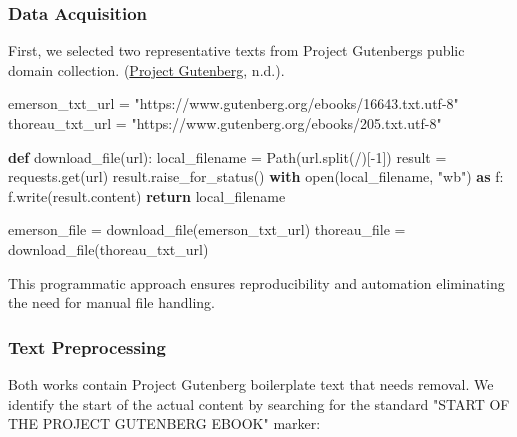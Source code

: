 \documentclass[
]{article}
\newenvironment{Shaded}{}{}
\newcommand{\BuiltInTok}[1]{\textcolor[rgb]{0.00,0.50,0.00}{#1}}
\newcommand{\ControlFlowTok}[1]{\textcolor[rgb]{0.00,0.44,0.13}{\textbf{#1}}}
\newcommand{\DecValTok}[1]{\textcolor[rgb]{0.25,0.63,0.44}{#1}}
\newcommand{\ImportTok}[1]{\textcolor[rgb]{0.00,0.50,0.00}{\textbf{#1}}}
\newcommand{\KeywordTok}[1]{\textcolor[rgb]{0.00,0.44,0.13}{\textbf{#1}}}
\newcommand{\NormalTok}[1]{#1}
\newcommand{\OperatorTok}[1]{\textcolor[rgb]{0.40,0.40,0.40}{#1}}
\newcommand{\StringTok}[1]{\textcolor[rgb]{0.25,0.44,0.63}{#1}}
\begin{document}
\subsubsection{Data Acquisition}\label{data-acquisition}

First, we selected two representative texts from Project
Gutenberg\textquotesingle s public domain collection.
(\href{https://www.gutenberg.org/}{Project Gutenberg}, n.d.).

\begin{Shaded}
\begin{Highlighting}[]
\NormalTok{emerson\_txt\_url }\OperatorTok{=} \StringTok{"https://www.gutenberg.org/ebooks/16643.txt.utf{-}8"}
\NormalTok{thoreau\_txt\_url }\OperatorTok{=} \StringTok{"https://www.gutenberg.org/ebooks/205.txt.utf{-}8"}

\KeywordTok{def}\NormalTok{ download\_file(url):}
\NormalTok{    local\_filename }\OperatorTok{=}\NormalTok{ Path(url.split(}\StringTok{\textquotesingle{}/\textquotesingle{}}\NormalTok{)[}\OperatorTok{{-}}\DecValTok{1}\NormalTok{])}
\NormalTok{    result }\OperatorTok{=}\NormalTok{ requests.get(url)}
\NormalTok{    result.raise\_for\_status()}
    \ControlFlowTok{with} \BuiltInTok{open}\NormalTok{(local\_filename, }\StringTok{"wb"}\NormalTok{) }\ImportTok{as}\NormalTok{ f:}
\NormalTok{        f.write(result.content)}
    \ControlFlowTok{return}\NormalTok{ local\_filename}
    
\NormalTok{emerson\_file }\OperatorTok{=}\NormalTok{ download\_file(emerson\_txt\_url)}
\NormalTok{thoreau\_file }\OperatorTok{=}\NormalTok{ download\_file(thoreau\_txt\_url)}
\end{Highlighting}
\end{Shaded}

This programmatic approach ensures reproducibility and automation eliminating the need for manual file handling.

\subsubsection{Text Preprocessing}\label{text-preprocessing}

Both works contain Project Gutenberg boilerplate text that needs
removal. We identify the start of the actual content by searching for
the standard "START OF THE PROJECT GUTENBERG EBOOK" marker:
\end{document}
